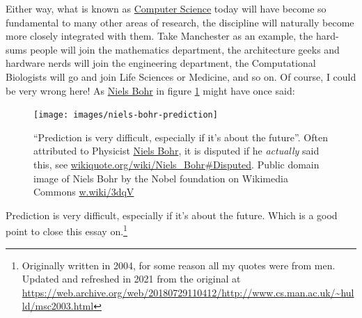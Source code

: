 \documentclass[
  12pt,
]{book}
\begin{document}
Either way, what is known as \href{https://en.wikipedia.org/wiki/Computer_science}{Computer Science} today will have become so fundamental to many other areas of research, the discipline will naturally become more closely integrated with them. Take Manchester as an example, the hard-sums people will join the mathematics department, the architecture geeks and hardware nerds will join the engineering department, the Computational Biologists will go and join Life Sciences or Medicine, and so on. Of course, I could be very wrong here! As \href{https://en.wikipedia.org/wiki/Niels_Bohr}{Niels Bohr} in figure \ref{fig:bohr-fig} might have once said:

\begin{figure}

{\centering \texttt{[image: images/niels-bohr-prediction]} 

}

\caption{``Prediction is very difficult, especially if it's about the future''. Often attributed to Physicist \href{https://en.wikipedia.org/wiki/Niels_Bohr}{Niels Bohr}, it is disputed if he \emph{actually} said this, see \href{https://en.wikiquote.org/wiki/Niels_Bohr\#Disputed}{wikiquote.org/wiki/Niels\_Bohr\#Disputed}. Public domain image of Niels Bohr by the Nobel foundation on Wikimedia Commons \href{https://w.wiki/3dqV}{w.wiki/3dqV}}\label{fig:bohr-fig}
\end{figure}



Prediction is very difficult, especially if it's about the future. Which is a good point to close this essay on.\footnote{Originally written in 2004, for some reason all my quotes were from men. Updated and refreshed in 2021 from the original at \url{https://web.archive.org/web/20180729110412/http://www.cs.man.ac.uk/~hulld/msc2003.html}}

  
\end{document}
